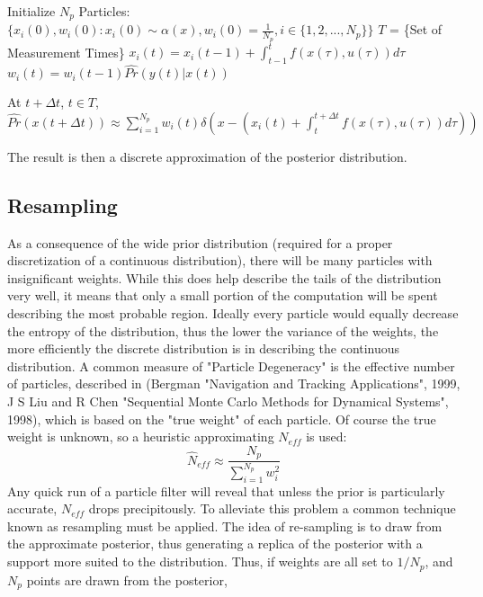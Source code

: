 \begin{algorithmic}
\STATE Initialize $N_p$ Particles: 
        $\{x_i(0),w_i(0) : x_i(0) \sim \alpha(x), w_i(0) = \frac{1}{N_p}, i \in \{1, 2, ... , N_p\} \}$
\STATE $T$ = \{Set of Measurement Times\}
        \STATE $x_i(t) = x_i(t-1) + \int_{t-1}^t f(x(\tau), u(\tau)) d\tau $
        \STATE $w_i(t) = w_i(t-1)\hat{Pr}(y(t) | x(t))$
    \ENDFOR
\ENDFOR

\STATE At $t + \Delta t$, $t \in T$, $\hat{Pr}(x(t+\Delta t)) \approx 
\sum_{i=1}^{N_p} w_i(t)\delta\left(x - (x_i(t) + \int_t^{t+\Delta t} f(x(\tau), u(\tau)) d\tau) \right)$
\end{algorithmic}
The result is then a discrete approximation of the posterior distribution. 

\subsection{Resampling}
\label{sec:Particle Filter Resampling}
As a consequence 
of the wide prior distribution (required for a proper discretization of a continuous
distribution), there will be many particles with insignificant weights. While this does help
describe the tails of the distribution very well, it means that only a small portion of the
computation will be spent describing the most probable region. Ideally every particle would 
equally decrease the entropy of the distribution, thus the lower the variance of the weights,
the more efficiently the discrete distribution is in describing the continuous distribution. 
A common measure of "Particle Degeneracy" is the effective number of particles, described
in (Bergman "Navigation and Tracking Applications", 1999, J S Liu and R Chen "Sequential 
Monte Carlo Methods for Dynamical Systems", 1998), which is based on the "true weight"
of each particle. Of course the true weight is unknown, so a heuristic approximating 
$N_{eff}$ is used:
\begin{equation}
\hat{N}_{eff} \approx \frac{N_p}{\sum_{i=1}^{N_p} w_i^2}
\label{eq:neff}
\end{equation}
Any quick run of a particle filter will reveal that unless the prior is particularly accurate,
$N_{eff}$ drops precipitously.  To alleviate this problem
a common technique known as resampling must be applied. The idea of re-sampling is to 
draw from the approximate posterior, thus generating a replica of the posterior with 
a support more suited to the distribution. Thus, if weights are all set to $1/N_p$, and 
$N_p$ points are drawn from the posterior,
